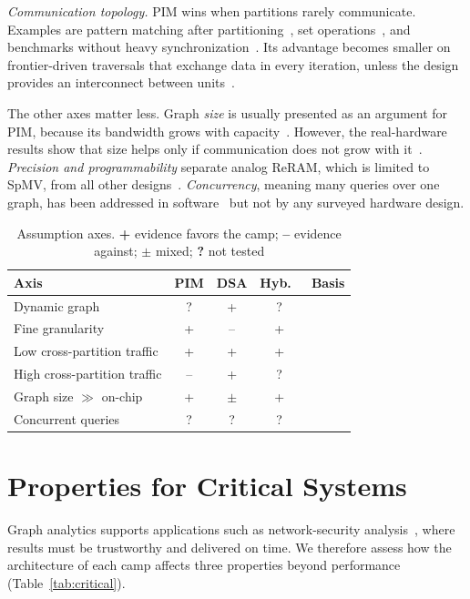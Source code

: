 \documentclass[journal,onecolumn]{IEEEtran}
\begin{document}
\emph{Communication topology.} PIM wins when partitions rarely communicate. Examples are pattern matching after partitioning~\cite{cai2024pimpam}, set operations~\cite{besta2021sisa}, and benchmarks without heavy synchronization~\cite{gomezluna2022prim}. Its advantage becomes smaller on frontier-driven traversals that exchange data in every iteration, unless the design provides an interconnect between units~\cite{zhuo2019graphq,barkhordar2025alphapim}.

The other axes matter less. Graph \emph{size} is usually presented as an argument for PIM, because its bandwidth grows with capacity~\cite{ahn2015tesseract,zhuo2019graphq}. However, the real-hardware results show that size helps only if communication does not grow with it~\cite{gomezluna2022prim}. \emph{Precision and programmability} separate analog ReRAM, which is limited to SpMV, from all other designs~\cite{song2018graphr}. \emph{Concurrency}, meaning many queries over one graph, has been addressed in software~\cite{yin2023glign} but not by any surveyed hardware design.

\begin{table}[t]
\caption{Assumption axes. \textbf{+} evidence favors the camp; \textbf{--} evidence against; $\pm$ mixed; \textbf{?} not tested}
\label{tab:axes}
\centering\footnotesize
\begin{tabularx}{\columnwidth}{@{}L{4.2cm}cccY@{}}
\toprule
Axis & PIM & DSA & Hyb.\ & Basis \\
\midrule
Dynamic graph & ? & + & ? & \cite{kim2020dynamic,rahman2021jetstream,gao2023mega,asquini2025tc} \\
Fine granularity & + & -- & + & \cite{shin2025piccolo,shin2025fala,yenimol2026cograf} \\
Low cross-partition traffic & + & + & + & \cite{gomezluna2022prim,cai2024pimpam} \\
High cross-partition traffic & -- & + & ? & \cite{gomezluna2022prim,barkhordar2025alphapim,zhuo2019graphq} \\
Graph size $\gg$ on-chip & + & $\pm$ & + & \cite{ahn2015tesseract,lee2022graphwave,chen2022regraph} \\
Concurrent queries & ? & ? & ? & \cite{yin2023glign} \\
\bottomrule
\end{tabularx}
\end{table}

\section{Properties for Critical Systems}\label{sec:critical}
Graph analytics supports applications such as network-security analysis~\cite{asquini2025tc}, where results must be trustworthy and delivered on time. We therefore assess how the architecture of each camp affects three properties beyond performance (Table~\ref{tab:critical}).
\end{document}
